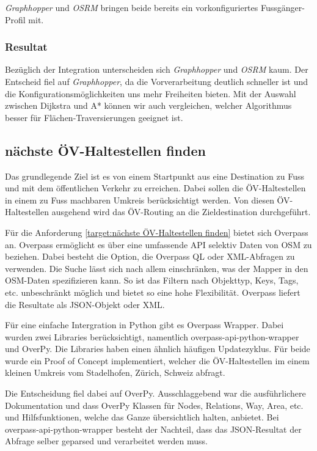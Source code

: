 \emph{Graphhopper} und \emph{OSRM} bringen beide bereits ein vorkonfiguriertes Fussgänger-Profil mit.

\subsubsection{Resultat}
\label{analyse:Resulat}
Bezüglich der Integration unterscheiden sich \emph{Graphhopper} und \emph{OSRM} kaum. Der Entscheid fiel auf \emph{Graphhopper}, da die Vorverarbeitung deutlich schneller ist und die Konfigurationsmöglichkeiten uns mehr Freiheiten bieten. Mit der Auswahl zwischen Dijkstra \cite{dijkstra_algorithm} und A* \cite{astar} können wir auch vergleichen, welcher Algorithmus besser für Flächen-Traversierungen geeignet ist.


\subsection{nächste ÖV-Haltestellen finden}
\label{analyse:nächste ÖV-Haltestellen finden}

Das grundlegende Ziel ist es von einem Startpunkt aus eine Destination zu Fuss und mit dem öffentlichen Verkehr zu erreichen. Dabei sollen die ÖV-Haltestellen in einem zu Fuss machbaren Umkreis berücksichtigt werden. Von diesen ÖV-Haltestellen ausgehend wird das ÖV-Routing an die Zieldestination durchgeführt.

Für die Anforderung \ref{target:nächste ÖV-Haltestellen finden} bietet sich Overpass an. Overpass ermöglicht es über eine umfassende \ac{API} selektiv Daten von \ac{OSM} zu beziehen. Dabei besteht die Option, die Overpass \ac{QL} oder XML-Abfragen zu verwenden. Die Suche lässt sich nach allem einschränken, was der Mapper in den \ac{OSM}-Daten spezifizieren kann. So ist das Filtern nach Objekttyp, Keys, Tags, etc. unbeschränkt möglich und bietet so eine hohe Flexibilität. Overpass liefert die Resultate als JSON-Objekt oder XML. 

Für eine einfache Intergration in Python gibt es Overpass Wrapper. Dabei wurden zwei Libraries berücksichtigt, namentlich overpass-api-python-wrapper und OverPy. Die Libraries haben einen ähnlich häufigen Updatezyklus. Für beide wurde ein Proof of Concept implementiert, welcher die ÖV-Haltestellen im einem kleinen Umkreis vom Stadelhofen, Zürich, Schweiz abfragt.

Die Entscheidung fiel dabei auf OverPy. Ausschlaggebend war die ausführlichere Dokumentation und dass OverPy Klassen für Nodes, Relations, Way, Area, etc. und Hilfsfunktionen, welche das Ganze übersichtlich halten, anbietet. Bei overpass-api-python-wrapper besteht der Nachteil, dass das JSON-Resultat der Abfrage selber geparsed und verarbeitet werden muss.

